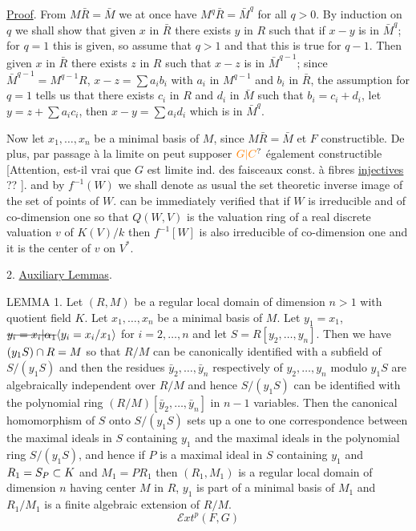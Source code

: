 \uline{Proof}. From $M\bar R=\bar M$ we at once have $M^q\bar R=\bar M^q$ for all $q>0$. By induction on $q$ we shall show that given $x$ in $\bar R$ there exists $y$ in $R$ such that if $x-y$ is in $\bar M^q$; for $q=1$ this is given, so assume that $q>1$ and that this is true for $q-1$. Then given $x$ in $\bar R$ there exists $z$ in $R$ such that $x-z$ is in $\bar M^{q-1}$; since $\bar M^{q-1}=M^{q-1}R$, $x-z=\sum a_i b_i$ with $a_i$ in $M^{q-1}$ and $b_i$ in $\bar R$, the assumption for $q=1$ tells us that there exists $c_i$ in $R$ and $d_i$ in $\bar M$ such that $b_i=c_i+d_i$, let $y=z+\sum a_i c_i$, then $x-y=\sum a_i d_i$ which is in $\bar M^q$.

Now let $x_1,\ldots,x_n$ be a minimal basis of $M$, since $M\bar R=\bar M$
et $F$ constructible. De plus, par passage à la limite on peut supposer  $\unsure{G|C}$ également constructible [Attention, est-il vrai que $G$ est limite ind.  des  faisceaux const. à fibres \uline{injectives} ?? ].
and by $f^{-1}(W)$ we shall denote as usual the set theoretic inverse image of the set of points of $W$.  can be immediately verified that if $W$ is irreducible and of co-dimension one so that $Q(W,V)$ is the valuation ring of a real discrete valuation $v$ of $K(V)/k$ then $f^{-1}[W]$ is also irreducible of co-dimension one and it is the center of $v$ on $V^*$.

2. \uline{Auxiliary Lemmas}.

LEMMA 1. Let $(R,M)$ be a regular local domain of dimension $n>1$ with quotient field $K$. Let $x_1,\ldots,x_n$ be a minimal basis of $M$. Let $y_1=x_1$, $\deleted{y_i=x_i\vert\alpha_1}\handwritten{\inserted{y_i=x_i/x_1}}$ for $i=2,\ldots,n$ and let $S=R[y_2,\ldots,y_n]$. Then we have $(y_1S)\cap R=M$ so that $R/M$ can be canonically identified with a subfield of $S/(y_1S)$ and then the residues $\bar y_2,\ldots,\bar y_n$ respectively of $y_2,\ldots,y_n$ modulo $y_1S$ are algebraically independent over $R/M$ and hence $S/(y_1S)$ can be identified with the polynomial ring $(R/M)[\bar y_2,\ldots,\bar y_n]$ in $n-1$ variables. Then the canonical homomorphism of $S$ onto $S/(y_1S)$ sets up a one to one correspondence between the maximal ideals in $S$ containing $y_1$ and the maximal ideals in the polynomial ring $S/(y_1S)$, and hence if $P$ is a maximal ideal in $S$ containing $y_1$ and $R_1=S_P\subset K$ and $M_1=PR_1$ then $(R_1,M_1)$ is a regular local domain of dimension $n$ having center $M$ in $R$, $y_1$ is part of a minimal basis of $M_1$ and $R_1/M_1$ is a finite algebraic extension of $R/M$.
\[
\mathscr{E}xt^p(F,G)
\]

